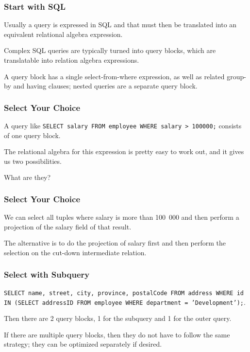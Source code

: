 \begin{frame}
\frametitle{Start with SQL}
Usually a query is expressed in SQL and that must then be translated into an equivalent relational algebra expression. 

Complex SQL queries are typically turned into \alert{query blocks}, which are translatable into relation algebra expressions. 

A query block has a single select-from-where expression, as well as related group-by and having clauses; nested queries are a separate query block.

\end{frame}

\begin{frame}
\frametitle{Select Your Choice}
A query like \texttt{SELECT salary FROM employee WHERE salary > 100000;} consists of one query block. 

The relational algebra for this expression is pretty easy to work out, and it gives us two possibilities. 

What are they?

\end{frame}

\begin{frame}
\frametitle{Select Your Choice}

We can select all tuples where salary is more than 100~000 and then perform a projection of the salary field of that result. 

The alternative is to do the projection of salary first and then perform the selection on the cut-down intermediate relation.

\end{frame}


\begin{frame}
\frametitle{Select with Subquery}

\texttt{SELECT name, street, city, province, postalCode FROM address WHERE id IN (SELECT addressID FROM employee WHERE department = 'Development');}. 

Then there are 2 query blocks, 1 for the subquery and 1 for the outer query. 

If there are multiple query blocks, then they do not have to follow the same strategy; they can be optimized separately if desired. 

\end{frame}


